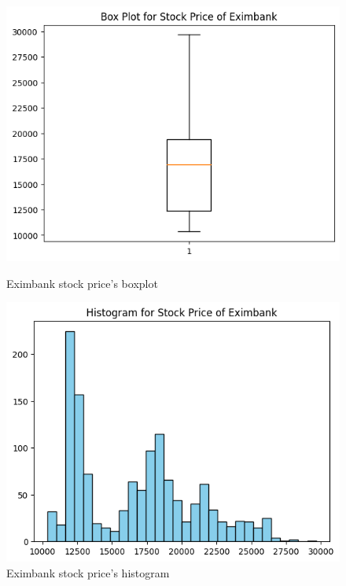 \begin{figure}[H]
    \centering
    \begin{minipage}{0.23\textwidth}
    \centering
    \includegraphics[width=1\textwidth]{resources/chapter-3/newdata/Boxplot_Eximbank.png}
    \caption{Eximbank stock price's boxplot}
    \label{fig:eximbank_boxplot}
    \end{minipage}
    \hfill
    \begin{minipage}{0.23\textwidth}
    \centering
    \includegraphics[width=1\textwidth]{resources/chapter-3/newdata/Histogram_Eximbank.png}
    \caption{Eximbank stock price's histogram}
    \label{fig:eximbank_histogram}
    \end{minipage}
\end{figure}

